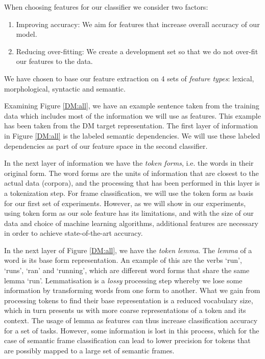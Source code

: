 When choosing features for our classifier we consider two factors:

\begin{enumerate}
    \item Improving accuracy: We aim for features that increase overall accuracy of our model.
    \item Reducing over-fitting: We create a development set so that we do not over-fit our features to the data.
\end{enumerate}

We have chosen to base our feature extraction on 4 sets of \textit{feature types}: lexical, morphological, syntactic and semantic.

Examining Figure \ref{DM:all}, we have an example sentence taken from the training data which includes most of the information we will use as features. This example has been taken from the DM target representation. The first layer of information in Figure \ref{DM:all} is the labeled semantic dependencies. We will use these labeled dependencies as part of our feature space in the second classifier. 

In the next layer of information we have the \textit{token forms}, i.e. the words in their original form. The word forms are the units of information that are closest to the actual data (corpora), and the processing that has been performed in this layer is a tokenization step. For frame classification, we will use the token form as basis for our first set of experiments. However, as we will show in our experiments, using token form as our sole feature has its limitations, and with the size of our data and choice of machine learning algorithms, additional features are necessary in order to achieve state-of-the-art accuracy.

In the next layer of Figure \ref{DM:all}, we have the \textit{token lemma}. The \textit{lemma} of a word is its base form representation. An example of this are the verbs `run', `runs', `ran' and `running', which are different word forms that share the same lemma `run'. Lemmatisation is a \textit{lossy} processing step whereby we lose some information by transforming words from one form to another. What we gain from processing tokens to find their base representation is a reduced vocabulary size, which in turn presents us with more coarse representations of a token and its context. The usage of lemma as features can thus increase classification accuracy for a set of tasks. However, some information is lost in this process, which for the case of semantic frame classification can lead to lower precision for tokens that are possibly mapped to a large set of semantic frames.

